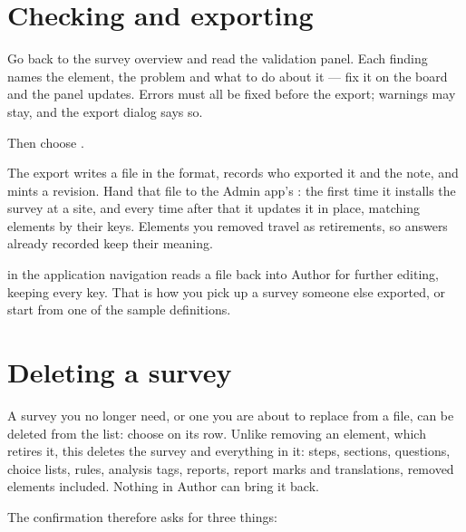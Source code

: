 \documentclass[11pt, a4paper]{article}
\begin{document}
\section{Checking and exporting}
\label{sec:export}

Go back to the survey overview and read the validation panel. Each finding names the element,
the problem and what to do about it — fix it on the board and the panel updates. Errors must all
be fixed before the export; warnings may stay, and the export dialog says so.

Then choose .


The export writes a  file in the  format,
records who exported it and the note, and mints a revision. Hand that file to the Admin app's
: the first time it installs the survey at a site, and every time
after that it updates it in place, matching elements by their keys. Elements you removed travel
as retirements, so answers already recorded keep their meaning.

\begin{elicitnote}
 in the application navigation reads a  file back into
Author for further editing, keeping every key. That is how you pick up a survey someone else
exported, or start from one of the sample definitions.
\end{elicitnote}

\section{Deleting a survey}
\label{sec:delete}

A survey you no longer need, or one you are about to replace from a file, can be deleted from the
 list: choose  on its row. Unlike removing an element, which retires it,
this deletes the survey and everything in it: steps, sections, questions, choice lists, rules,
analysis tags, reports, report marks and translations, removed elements included. Nothing in Author can bring it back.

The confirmation therefore asks for three things:
\end{document}
